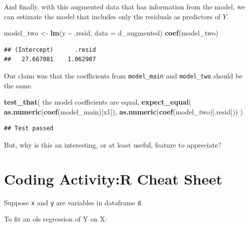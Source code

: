 \documentclass[
]{book}
\newenvironment{Shaded}{\begin{snugshade}}{\end{snugshade}}
\newcommand{\AttributeTok}[1]{\textcolor[rgb]{0.13,0.29,0.53}{#1}}
\newcommand{\FunctionTok}[1]{\textcolor[rgb]{0.13,0.29,0.53}{\textbf{#1}}}
\newcommand{\NormalTok}[1]{#1}
\newcommand{\OtherTok}[1]{\textcolor[rgb]{0.56,0.35,0.01}{#1}}
\newcommand{\SpecialCharTok}[1]{\textcolor[rgb]{0.81,0.36,0.00}{\textbf{#1}}}
\newcommand{\StringTok}[1]{\textcolor[rgb]{0.31,0.60,0.02}{#1}}
\theoremstyle{definition}
\theoremstyle{definition}
\theoremstyle{definition}
\theoremstyle{definition}
\theoremstyle{remark}
\begin{document}
And finally, with this augmented data that has information from the model, we can estimate the model that includes only the residuals as predictors of \(Y\).

\begin{Shaded}
\begin{Highlighting}[]
\NormalTok{model\_two }\OtherTok{\textless{}{-}} \FunctionTok{lm}\NormalTok{(y }\SpecialCharTok{\textasciitilde{}}\NormalTok{ .resid, }\AttributeTok{data =}\NormalTok{ d\_augmented)}
\FunctionTok{coef}\NormalTok{(model\_two)}
\end{Highlighting}
\end{Shaded}

\begin{verbatim}
## (Intercept)      .resid 
##   27.667081    1.062987
\end{verbatim}

Our claim was that the coefficients from \texttt{model\_main} and \texttt{model\_two} should be the same.

\begin{Shaded}
\begin{Highlighting}[]
\FunctionTok{test\_that}\NormalTok{(}
  \StringTok{\textquotesingle{}the model coefficients are equal\textquotesingle{}}\NormalTok{, }
  \FunctionTok{expect\_equal}\NormalTok{(}
    \FunctionTok{as.numeric}\NormalTok{(}\FunctionTok{coef}\NormalTok{(model\_main)[}\StringTok{\textquotesingle{}x1\textquotesingle{}}\NormalTok{]), }
    \FunctionTok{as.numeric}\NormalTok{(}\FunctionTok{coef}\NormalTok{(model\_two)[}\StringTok{\textquotesingle{}.resid\textquotesingle{}}\NormalTok{]))}
\NormalTok{)}
\end{Highlighting}
\end{Shaded}

\begin{verbatim}
## Test passed
\end{verbatim}

But, why is this an interesting, or at least useful, feature to appreciate?

\hypertarget{coding-activityr-cheat-sheet}{%
\section{Coding Activity:R Cheat Sheet}\label{coding-activityr-cheat-sheet}}

Suppose \texttt{x} and \texttt{y} are variables in dataframe \texttt{d}.

To fit an ols regression of Y on X:
\end{document}
